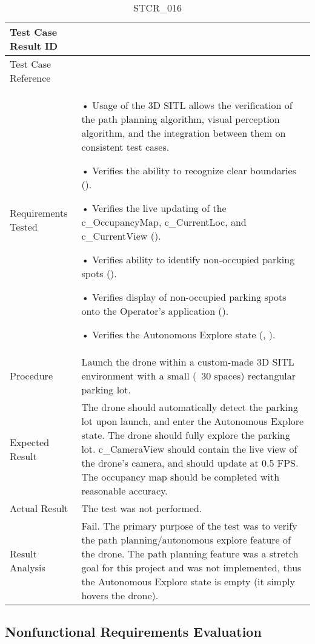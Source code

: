 \documentclass[12pt, titlepage]{article}
\begin{document}
\begin{table}[!h]
\begin{center}
\caption {STCR\_016}
\label{tab:STCR_016}
\begin{tabular}{ | m{3.2cm} | m{12.2cm} | } 
\hline
Test Case Result ID & \nameref{tab:STCR_016} \\ 
\hline
Test Case Reference & \nameref{tab:STC_016}  \\ 
\hline
Requirements Tested & 
• Usage of the 3D SITL allows the verification of the path planning algorithm, visual perception algorithm, and the integration between them on consistent test cases.

• Verifies the ability to recognize clear boundaries (\nameref{GEN_001}).

• Verifies the live updating of the c_OccupancyMap, c_CurrentLoc, and c_CurrentView (\nameref{GEN_002}).

• Verifies ability to identify non-occupied parking spots (\nameref{GEN_005}).

• Verifies display of non-occupied parking spots onto the Operator's application (\nameref{GEN_006}).

• Verifies the Autonomous Explore state (\nameref{STA_003}, \nameref{TRANS_003}).
\\ 
\hline
Procedure & Launch the drone within a custom-made 3D SITL environment with a small (~30 spaces) rectangular parking lot.  \\
\hline
Expected Result & The drone should automatically detect the parking lot upon launch, and enter the Autonomous Explore state. The drone should fully explore the parking lot. c\_CameraView should contain the live view of the drone's camera, and should update at 0.5 FPS. The occupancy map should be completed with reasonable accuracy.  \\ 
\hline
Actual Result &  The test was not performed. \\
\hline
Result Analysis & Fail. The primary purpose of the test was to verify the path planning/autonomous explore feature of the drone. The path planning feature was a stretch goal for this project and was not implemented, thus the Autonomous Explore state is empty (it simply hovers the drone).    \\ 
\hline
\end{tabular}
\end{center}
\end{table}

\clearpage

\subsection{Nonfunctional Requirements Evaluation}
\end{document}
